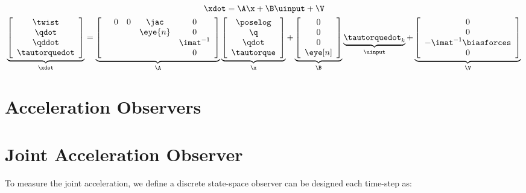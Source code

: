 \begin{gather}
  \xdot = \A \x + \B \uinput + \V \label{eqn:ss_generic} \\
  \label{eqn:ss_continuous}
  \underbrace{\left[
      \begin{array}{c}
        \twist \\
        \qdot \\
        \qddot \\
        \tautorquedot
      \end{array}\right]}_{\xdot}=
  \underbrace{\left[
      \begin{array}{ccccc}
          & 0 & 0 & \jac & 0 \\
         &&& \eye{n} & 0 \\
          &&&& \imat^{-1} \\
          &&&& 0
      \end{array}\right]}_{\A}
  \underbrace{\left[
      \begin{array}{c}
        \poselog \\
        \q \\
        \qdot \\
        \tautorque
      \end{array}\right]}_{\x}
  + \underbrace{
    \left[
      \begin{array}{ccc}
        0 \\
        0 \\
        0 \\
        \eye[ n ]
      \end{array}\right]}_{\B}
  \underbrace{\tautorquedot_{k}}_{\uinput}
  + \underbrace{
    \left[
      \begin{array}{ccc}
        0 \\
        0 \\
        -\imat^{-1}\biasforces \\
        0
      \end{array}\right]}_{\V}
\end{gather}

\section{Acceleration Observers}

\section{Joint Acceleration Observer}

To measure the joint acceleration, we define a discrete state-space observer can
be designed each time-step as:

